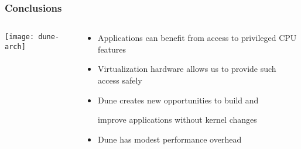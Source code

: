 \begin{frame}[plain]
	\frametitle{Conclusions }
	
	
	
	\begin{columns}
		
		\begin{column}{.4\textwidth}
			
			
			\texttt{[image: dune-arch]}
			
		\end{column}
		
		\begin{column}{.6\textwidth}
			\begin{itemize}
				\item Applications	 can	 benefit	 from	 access	 to	 privileged	CPU	 features		
				\item Virtualization	 hardware	 allows	 us	 to	 provide	 such	access	 safely	
				\item Dune	
 creates	
 new	
 opportunities	
 to	
 build	
 and	
  
				improve	
 applications	
 without	
 kernel	
 changes	
 
				\item Dune	 has	 modest	 performance	 overhead				
			\end{itemize}
		\end{column}
		
		
	\end{columns}
	
	
\end{frame}
